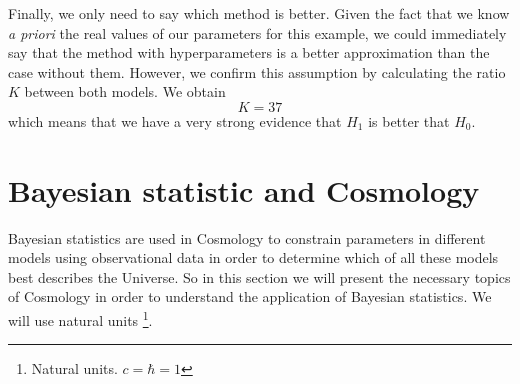 \documentclass[onecolumn,           %
               showpacs,            %
               preprintnumbers,     %
               aps,                 %
               prl,          	    %
               letterpaper,             %
               superscriptaddress,      %
               nofootinbib,         %
               tightenlines,        %
               floats,floatfix      %
               ,usenatbib,
               ]{revtex4-1}
\begin{document}
Finally, we only need to say which method is better. Given the fact that we know \textit{a priori} the real values of our parameters for this example, we could immediately say that the method with hyperparameters is a better approximation than the case without them. However, we confirm this assumption by calculating the ratio $K$ between both models. We obtain
\begin{equation}
K = 37
\end{equation}
which means that we have a very strong evidence that $H_1$ is better that $H_0$.

\section{Bayesian statistic and Cosmology}


Bayesian statistics are used in Cosmology to constrain parameters in different models using observational data in order to determine which of all these models best describes the Universe. So in this section we will present the necessary topics of Cosmology in order to understand the application of Bayesian statistics. We will use natural units \footnote{Natural units. $c=\hbar=1$}.
\end{document}
